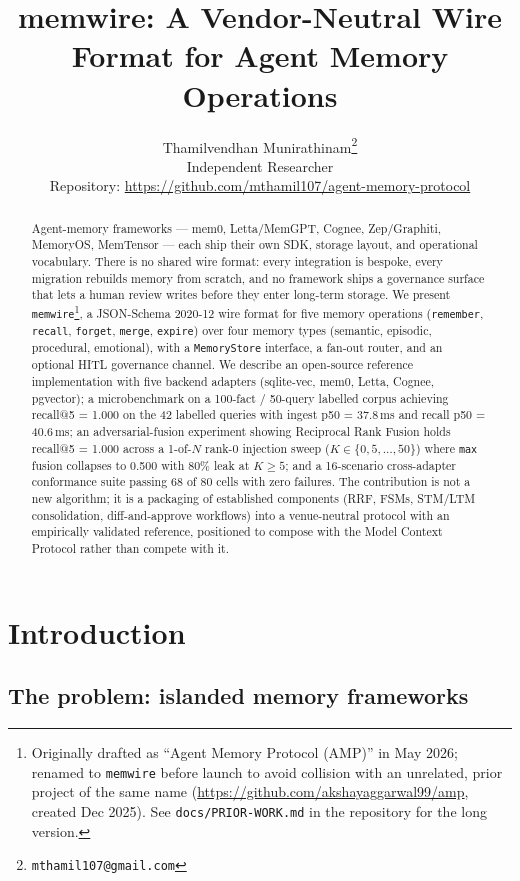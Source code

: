 \documentclass[11pt,letterpaper,twocolumn]{article}
\title{memwire: A Vendor-Neutral Wire Format for Agent Memory Operations}
\author{
  Thamilvendhan Munirathinam\thanks{\texttt{mthamil107@gmail.com}}\\
  Independent Researcher\\
  \small{Repository: \url{https://github.com/mthamil107/agent-memory-protocol}}
}
\date{}
\begin{document}
\maketitle

\begin{abstract}
Agent-memory frameworks --- mem0, Letta/MemGPT, Cognee, Zep/Graphiti, MemoryOS, MemTensor --- each ship their own SDK, storage layout, and operational vocabulary. There is no shared wire format: every integration is bespoke, every migration rebuilds memory from scratch, and no framework ships a governance surface that lets a human review writes before they enter long-term storage. We present \texttt{memwire}\footnote{Originally drafted as ``Agent Memory Protocol (AMP)'' in May 2026; renamed to \texttt{memwire} before launch to avoid collision with an unrelated, prior project of the same name (\url{https://github.com/akshayaggarwal99/amp}, created Dec 2025). See \texttt{docs/PRIOR-WORK.md} in the repository for the long version.}, a JSON-Schema 2020-12 wire format for five memory operations (\texttt{remember}, \texttt{recall}, \texttt{forget}, \texttt{merge}, \texttt{expire}) over four memory types (semantic, episodic, procedural, emotional), with a \texttt{MemoryStore} interface, a fan-out router, and an optional HITL governance channel. We describe an open-source reference implementation with five backend adapters (sqlite-vec, mem0, Letta, Cognee, pgvector); a microbenchmark on a 100-fact / 50-query labelled corpus achieving recall@5 = 1.000 on the 42 labelled queries with ingest p50 = 37.8\,ms and recall p50 = 40.6\,ms; an adversarial-fusion experiment showing Reciprocal Rank Fusion holds recall@5 = 1.000 across a 1-of-$N$ rank-0 injection sweep ($K \in \{0,5,\dots,50\}$) where \texttt{max} fusion collapses to 0.500 with 80\% leak at $K \geq 5$; and a 16-scenario cross-adapter conformance suite passing 68 of 80 cells with zero failures. The contribution is not a new algorithm; it is a packaging of established components (RRF, FSMs, STM/LTM consolidation, diff-and-approve workflows) into a venue-neutral protocol with an empirically validated reference, positioned to compose with the Model Context Protocol rather than compete with it.
\end{abstract}

\section{Introduction}
\label{sec:intro}

\subsection{The problem: islanded memory frameworks}
\label{sec:intro-problem}
\end{document}
